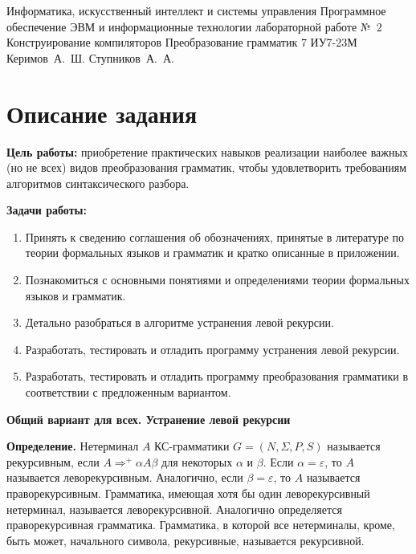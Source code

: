 \documentclass{bmstu-gost-7-32}
\begin{document}
\makereporttitle
	{Информатика, искусственный интеллект и системы управления} %
	{Программное обеспечение ЭВМ и информационные технологии} %
	{лабораторной работе №~2} %
	{Конструирование компиляторов} %
	{Преобразование грамматик} %
	{7} %
	{ИУ7-23М} %
	{Керимов~А.~Ш.} %
	{Ступников~А.~А.} %

\section*{Описание задания}

\textbf{Цель работы:} приобретение практических навыков реализации наиболее важных (но не всех) видов преобразования грамматик, чтобы удовлетворить требованиям алгоритмов синтаксического разбора.

\textbf{Задачи работы:}
\begin{enumerate}
	\item Принять к сведению соглашения об обозначениях, принятые в литературе по теории формальных языков и грамматик и кратко описанные в приложении.
	\item Познакомиться с основными понятиями и определениями теории формальных языков и грамматик.
	\item Детально разобраться в алгоритме устранения левой рекурсии.
	\item Разработать, тестировать и отладить программу устранения левой рекурсии.
	\item Разработать, тестировать и отладить программу преобразования грамматики в соответствии с предложенным вариантом.
\end{enumerate}

\textbf{Общий вариант для всех. Устранение левой рекурсии}

\textbf{Определение.}
Нетерминал $A$ КС-грамматики $G = (N, \Sigma, P, S)$ называется рекурсивным, если $A \Rightarrow^+ \alpha A \beta$ для некоторых $\alpha$ и $\beta$.
Если $\alpha = \varepsilon$, то $A$ называется леворекурсивным.
Аналогично, если $\beta = \varepsilon$, то $A$ называется праворекурсивным.
Грамматика, имеющая хотя бы один леворекурсивный нетерминал, называется леворекурсивной.
Аналогично определяется праворекурсивная грамматика.
Грамматика, в которой все нетерминалы, кроме, быть может, начального символа, рекурсивные, называется рекурсивной.
\end{document}
